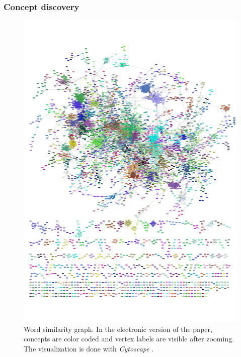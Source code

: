 \documentclass{kais}
\begin{document}
\subsubsection{Concept discovery}
\label{subsubsec: concept-discovery}

\begin{figure}
\centerline{\includegraphics[width=1.0\columnwidth]{figures/slpa-complete-adjusted_cropped.pdf}}
\caption{Word similarity graph. In the electronic version of the paper, concepts are color coded and 
vertex labels are visible after zooming. The visualization is done with \emph{Cytoscape} \protect\cite{Shannon2003}.}
\label{fig:graph-overview}
\end{figure}
\end{document}
